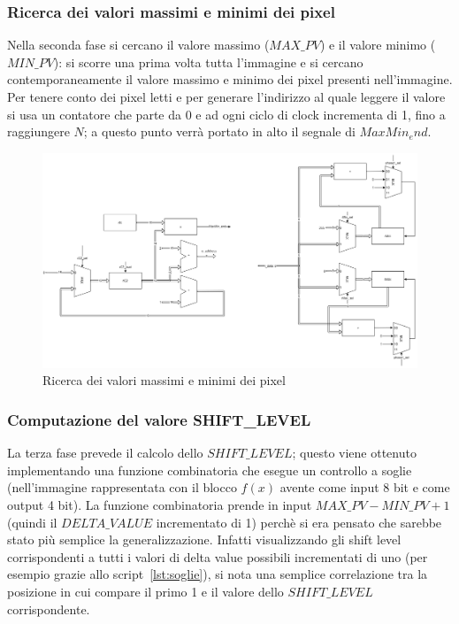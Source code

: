 \documentclass[11pt]{article} %
\begin{document}
\subsubsection{Ricerca dei valori massimi e minimi dei pixel}
Nella seconda fase si cercano il valore massimo ($MAX\_PV$) e il valore minimo ($MIN\_PV$): si scorre una prima volta tutta l'immagine e si cercano contemporaneamente il valore massimo e minimo dei pixel presenti nell'immagine. Per tenere conto dei pixel letti e per generare l'indirizzo al quale leggere il valore si usa un contatore che parte da 0 e ad ogni ciclo di clock incrementa di 1, fino a raggiungere $N$; a questo punto verrà portato in alto il segnale di $MaxMin_end$.

\begin{figure}[h]
\centering
\includegraphics[width=120mm]{datapaths/regMax_regMin.png}
\caption{Ricerca dei valori massimi e minimi dei pixel}
\end{figure}


\subsubsection{Computazione del valore SHIFT\_LEVEL}
La terza fase prevede il calcolo dello $SHIFT\_LEVEL$; questo viene ottenuto implementando una funzione combinatoria che esegue un controllo a soglie (nell'immagine rappresentata con il blocco $f(x)$ avente come input 8 bit e come output 4 bit). La funzione combinatoria prende in input $MAX\_PV - MIN\_PV + 1$ (quindi il $DELTA\_VALUE$ incrementato di 1) perchè si era pensato che sarebbe stato più semplice la generalizzazione. Infatti visualizzando gli shift level corrispondenti a tutti i valori di delta value possibili incrementati di uno (per esempio grazie allo script~\ref{lst:soglie}), si nota una semplice correlazione tra la posizione in cui compare il primo 1 e il valore dello $SHIFT\_LEVEL$ corrispondente.
\end{document}
